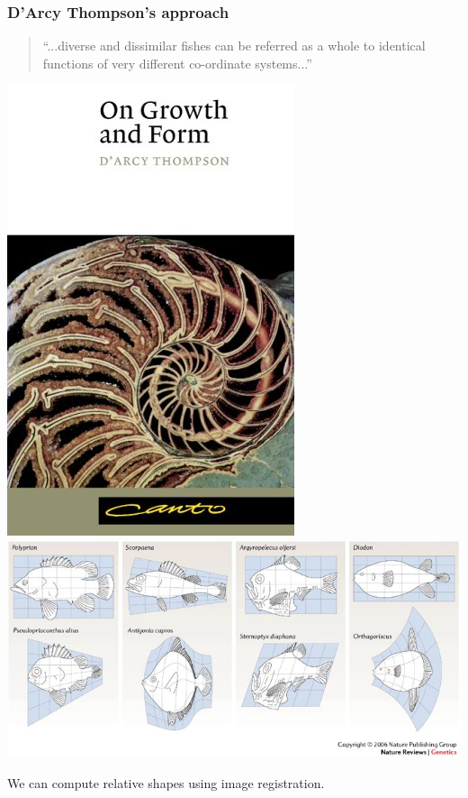 \begin{frame}
\frametitle{D'Arcy Thompson's approach}
\begin{quote}
``...diverse and dissimilar fishes can be referred as a whole to identical functions of very different co-ordinate systems...''
\end{quote}
\begin{center}
\includegraphics[height=0.4\textheight]{OGAF}
\includegraphics[height=0.4\textheight]{fish}
\end{center}
We can compute relative shapes using image registration.
\end{frame}



